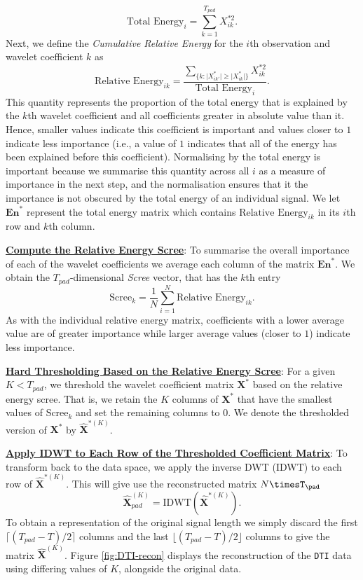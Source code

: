 \begin{steps}
  $$\text{Total Energy}_i = \sum_{k=1}^{T_{pad}}X^{*2}_{ik}.$$ Next, we define the \emph{Cumulative Relative Energy} for the $i$th observation and wavelet coefficient $k$ as 
  $$
  \text{Relative Energy}_{ik} = \frac{\sum_{\{k: \lvert X^*_{ik'}\rvert  \geq \lvert X^*_{ik}\rvert \}}X^{*2}_{ik}}{\text{Total Energy}_i}.
  $$
  This quantity represents the proportion of the total energy that is explained by the $k$th wavelet coefficient and all coefficients greater in absolute value than it. Hence, smaller values indicate this coefficient is important and values closer to $1$ indicate less importance (i.e., a value of $1$ indicates that all of the energy has been explained before this coefficient).
  Normalising by the total energy is important because we summarise this quantity across all $i$ as a measure of importance in the next step, and the normalisation ensures that it the importance is not obscured by the total energy of an individual signal. We let $\textbf{En}^*$ represent the total energy matrix which contains $\text{Relative Energy}_{ik}$ in its $i$th row and $k$th column.
  \item \underline{\textbf{Compute the Relative Energy Scree}}: To summarise the overall importance of each of the wavelet coefficients we average each column of the matrix $\textbf{En}^*$. We obtain the $T_{pad}$-dimensional \emph{Scree} vector, that has the $k$th entry
  $$
  \text{Scree}_k = \frac{1}{N} \sum_{i=1}^N \text{Relative Energy}_{ik}.
  $$
  As with the individual relative energy matrix, coefficients with a lower average value are of greater importance while larger average values (closer to $1$) indicate less importance.
  \item \underline{\textbf{Hard Thresholding Based on the Relative Energy Scree}}: For a given $K < T_{pad}$, we threshold the wavelet coefficient matrix $\mathbf{X}^*$ based on the relative energy scree. That is, we retain the $K$ columns of $\mathbf{X}^*$ that have the smallest values of $\text{Scree}_k$ and set the remaining columns to $0$. We denote the thresholded version of $\mathbf{X}^*$ by $\widehat{\mathbf{X}}^{*(K)}$.
  \item \underline{\textbf{Apply IDWT to Each Row of the Thresholded Coefficient Matrix}}: To transform back to the data space, we apply the inverse DWT (IDWT) to each row of $\widehat{\mathbf{X}}^{*(K)}$. This will give use the reconstructed matrix $N\timesT_{\pad}$
  $$
  \widehat{\mathbf{X}}^{(K)}_{pad} = \text{IDWT}(\widehat{\mathbf{X}}^{*(K)}).
  $$
  To obtain a representation of the original signal length we simply discard the first $\lceil (T_{pad} - T)/2 \rceil$ columns and the last $\lfloor (T_{pad} - T)/2 \rfloor$ columns to give the matrix $\widehat{\mathbf{X}}^{(K)}$. Figure \ref{fig:DTI-recon} displays the reconstruction of the \texttt{DTI} data using differing values of $K$, alongside the original data.

\end{steps}
